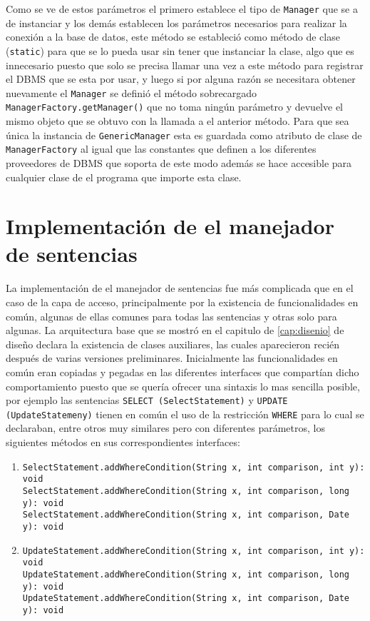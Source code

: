 Como se ve de estos parámetros el primero establece el tipo de \verb=Manager= que se a de instanciar y los demás establecen los parámetros necesarios para realizar la conexión a la base de datos, este método se estableció como método de clase (\verb=static=) para que se lo pueda usar sin tener que instanciar la clase, algo que es innecesario puesto que solo se precisa llamar una vez a este método para registrar el DBMS que se esta por usar, y luego si por alguna razón se necesitara obtener nuevamente el \verb=Manager= se definió el método sobrecargado \verb=ManagerFactory.getManager()= que no toma ningún parámetro y devuelve el mismo objeto que se obtuvo con la llamada a el anterior método. Para que sea única la instancia de \verb=GenericManager= esta es guardada como atributo de clase de \verb=ManagerFactory= al igual que las constantes que definen a los diferentes proveedores de DBMS que soporta \jj de este modo además se hace accesible para cualquier clase de el programa que importe esta clase.
%
\section{Implementación de el manejador de sentencias}
La implementación de el manejador de sentencias fue más complicada que en el caso de la capa de acceso, principalmente por la existencia de funcionalidades en común, algunas de ellas comunes para todas las sentencias y otras solo para algunas. La arquitectura base que se mostró en el capitulo de \ref{cap:disenio} de diseño declara la existencia de clases auxiliares, las cuales aparecieron recién después de varias versiones preliminares. Inicialmente las funcionalidades en común eran copiadas y pegadas en las diferentes interfaces que compartían dicho comportamiento puesto que se quería ofrecer una sintaxis lo mas sencilla posible, por ejemplo las sentencias \verb=SELECT (SelectStatement)= y \verb=UPDATE (UpdateStatemeny)= tienen en común el uso de la restricción \verb=WHERE= para lo cual se declaraban, entre otros muy similares pero con diferentes parámetros, los siguientes métodos en sus correspondientes interfaces:
%
\begin{enumerate}
\item \verb=SelectStatement.addWhereCondition(String x, int comparison, int y): void= \\
	\verb=SelectStatement.addWhereCondition(String x, int comparison, long y): void= \\
	\verb=SelectStatement.addWhereCondition(String x, int comparison, Date y): void= \\
\item \verb=UpdateStatement.addWhereCondition(String x, int comparison, int y): void= \\
	\verb=UpdateStatement.addWhereCondition(String x, int comparison, long y): void= \\
	\verb=UpdateStatement.addWhereCondition(String x, int comparison, Date y): void= \\
\end{enumerate}   
%

